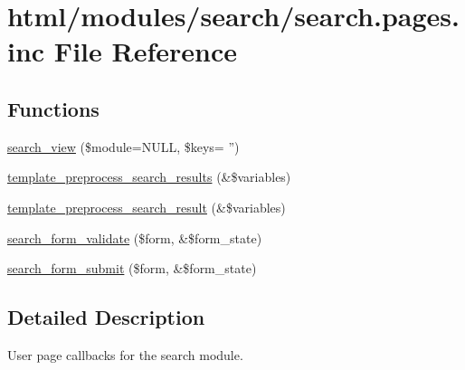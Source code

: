 \hypertarget{search_8pages_8inc}{
\section{html/modules/search/search.pages.inc File Reference}
\label{search_8pages_8inc}
}
\subsection*{Functions}
\begin{DoxyCompactItemize}
\item 
\hyperlink{search_8pages_8inc_aa4798bb08a1df2c280b943182d53892e}{search\_\-view} (\$module=NULL, \$keys= '')
\item 
\hyperlink{search_8pages_8inc_aa0012b762375491296b1248124a177e9}{template\_\-preprocess\_\-search\_\-results} (\&\$variables)
\item 
\hyperlink{search_8pages_8inc_a45d5ee9444aba311056f3949e503b426}{template\_\-preprocess\_\-search\_\-result} (\&\$variables)
\item 
\hyperlink{search_8pages_8inc_a9b4ec561b0b5121050f68541e7047a6d}{search\_\-form\_\-validate} (\$form, \&\$form\_\-state)
\item 
\hyperlink{search_8pages_8inc_a709df5e6ae41e0d9cccd0c1f3c0a410e}{search\_\-form\_\-submit} (\$form, \&\$form\_\-state)
\end{DoxyCompactItemize}


\subsection{Detailed Description}
User page callbacks for the search module. 

